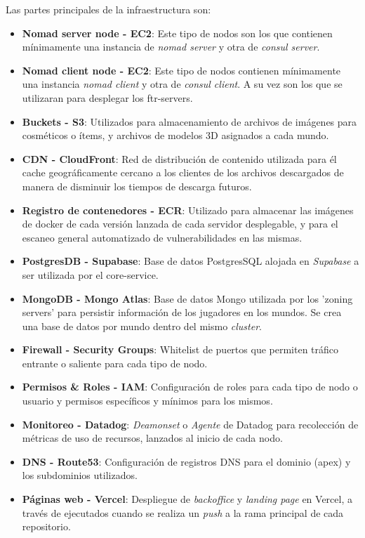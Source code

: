 Las partes principales de la infraestructura son:
\begin{itemize}
    \item \textbf{Nomad server node - EC2}: Este tipo de nodos son los que contienen mínimamente
        una instancia de \textit{nomad server} y otra de \textit{consul server}.
    \item \textbf{Nomad client node - EC2}: Este tipo de nodos contienen mínimamente una instancia
        \textit{nomad client} y otra de \textit{consul client}. A su vez son los que se utilizaran para desplegar los ftr-servers.
    \item \textbf{Buckets - S3}: Utilizados para almacenamiento de archivos de imágenes para cosméticos o ítems,
        y archivos de modelos 3D asignados a cada mundo.
    \item \textbf{CDN - CloudFront}: Red de distribución de contenido utilizada para él cache geográficamente cercano a los clientes
        de los archivos descargados de manera de disminuir los tiempos de descarga futuros.
    \item \textbf{Registro de contenedores  - ECR}: Utilizado para almacenar las imágenes de docker de cada versión lanzada
        de cada servidor desplegable, y para el escaneo general automatizado de vulnerabilidades en las mismas.
    \item \textbf{PostgresDB - Supabase}: Base de datos PostgresSQL alojada en \textit{Supabase} a ser utilizada por el core-service.
    \item \textbf{MongoDB - Mongo Atlas}: Base de datos Mongo utilizada por los 'zoning servers' para persistir información de los jugadores
        en los mundos. Se crea una base de datos por mundo dentro del mismo \textit{cluster}.
    \item \textbf{Firewall - Security Groups}: Whitelist de puertos que permiten tráfico entrante o saliente para cada tipo de nodo.
    \item \textbf{Permisos \& Roles - IAM}: Configuración de roles para cada tipo de nodo o usuario y permisos específicos
        y mínimos para los mismos.
    \item \textbf{Monitoreo - Datadog}: \textit{Deamonset} o \textit{Agente} de Datadog para recolección de métricas de uso de recursos,
        lanzados al inicio de cada nodo.
    \item \textbf{DNS - Route53}: Configuración de registros DNS para el dominio (apex) y los subdominios utilizados.
    \item \textbf{Páginas web - Vercel}: Despliegue de \textit{backoffice} y \textit{landing page} en Vercel, a través de 
        ejecutados cuando se realiza un \textit{push} a la rama principal de cada repositorio.
\end{itemize}

